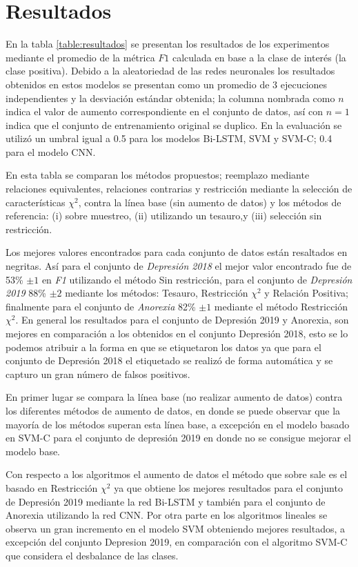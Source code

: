 \section{Resultados}

En la tabla \ref{table:resultados} se presentan los resultados de los experimentos mediante el promedio  de la métrica $F1$ calculada en base a la clase de interés (la clase positiva). Debido a la aleatoriedad de las redes neuronales los resultados obtenidos en estos modelos se presentan como un promedio de 3 ejecuciones independientes y la desviación estándar obtenida; la columna nombrada como $n$ indica el valor de aumento correspondiente en el conjunto de datos, así con $n=1$ indica que el conjunto de entrenamiento original se duplico. En la evaluación se utilizó un umbral igual a 0.5 para los modelos Bi-LSTM, SVM y SVM-C; 0.4 para el modelo CNN.

En esta tabla se comparan los métodos propuestos; reemplazo mediante relaciones equivalentes, relaciones contrarias y restricción mediante la selección de características $\chi^2$, contra la línea base (sin aumento de datos) y los métodos de referencia: (i) sobre muestreo, (ii) utilizando un tesauro,y (iii)  selección sin restricción.

Los mejores valores encontrados para cada conjunto de datos están resaltados en negritas. Así para el conjunto de \textit{Depresión 2018} el mejor valor encontrado fue de 53\% $\pm 1$  en \textit{F1} utilizando el método Sin restricción, para el conjunto de \textit{Depresión 2019} 88\% $\pm 2$ mediante los métodos: Tesauro, Restricción $\chi^2$ y Relación Positiva; finalmente para el conjunto de \textit{Anorexia} 82\% $\pm 1$ mediante el método Restricción $\chi^2$. En general los resultados para el conjunto de Depresión 2019 y Anorexia, son mejores en comparación a los obtenidos en el conjunto Depresión 2018, esto se lo podemos atribuir a la forma en que se etiquetaron los datos ya que para el conjunto de Depresión 2018 el etiquetado se realizó de forma automática y se capturo un gran número de falsos positivos.

En primer lugar se compara la línea base (no realizar aumento de datos) contra los diferentes métodos de aumento de datos, en donde se puede observar que la mayoría de los métodos superan esta línea base, a excepción en el modelo basado en SVM-C para el conjunto de depresión 2019 en donde no se consigue mejorar el modelo base.

Con respecto a los algoritmos el aumento de datos el método que sobre sale es el basado en Restricción $\chi^2$ ya que obtiene los mejores resultados para el conjunto de Depresión 2019 mediante la red Bi-LSTM y también para el conjunto de Anorexia utilizando la red CNN. Por otra parte en los algoritmos lineales se observa un gran incremento en el modelo SVM obteniendo mejores resultados, a excepción del conjunto Depresion 2019, en comparación con el algoritmo SVM-C que considera el desbalance de las clases. 






